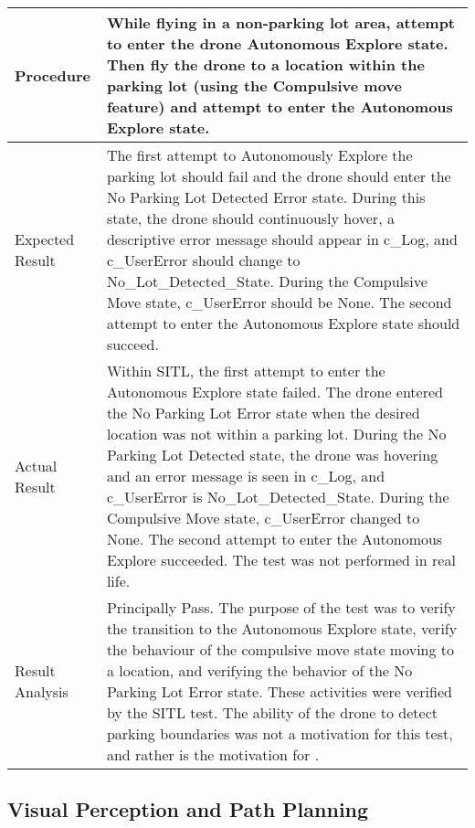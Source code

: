 \documentclass[12pt, titlepage]{article}
\begin{document}
\begin{table}[!h]
\begin{center}
\begin{tabular}{ | m{3.2cm} | m{12.2cm} | }
\\ 
\hline
Procedure & While flying in a non-parking lot area, attempt to enter the drone Autonomous Explore state. Then fly the drone to a location within the parking lot (using the Compulsive move feature) and attempt to enter the Autonomous Explore state.     \\
\hline
Expected Result & The first attempt to Autonomously Explore the parking lot should fail and the drone should enter the No Parking Lot Detected Error state. During this state, the drone should continuously hover, a descriptive error message should appear in c\_Log, and c\_UserError should change to No_Lot_Detected_State. During the Compulsive Move state, c_UserError should be None. The second attempt to enter the Autonomous Explore state should succeed.   \\ 
\hline
Actual Result & Within SITL, the first attempt to enter the Autonomous Explore state failed. The drone entered the No Parking Lot Error state when the desired location was not within a parking lot. During the No Parking Lot Detected state, the drone was hovering and an error message is seen in c\_Log, and c\_UserError is No_Lot_Detected_State. During the Compulsive Move state, c_UserError changed to None. The second attempt to enter the Autonomous Explore succeeded. The test was not performed in real life.  \\
\hline
Result Analysis & Principally Pass. The purpose of the test was to verify the transition to the Autonomous Explore state, verify the behaviour of the compulsive move state moving to a location, and verifying the behavior of the No Parking Lot Error state. These activities were verified by the SITL test. The ability of the drone to detect parking boundaries was not a motivation for this test, and rather is the motivation for \nameref{tab:STC_014}.   \\ 
\hline
\end{tabular}
\end{center}
\end{table}

\clearpage

\subsection{Visual Perception and Path Planning}
\end{document}
